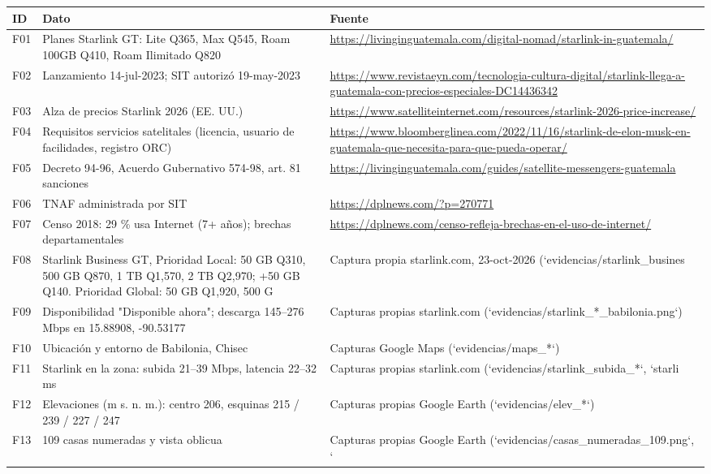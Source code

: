\begin{longtable}{p{.9cm}p{5.6cm}p{6.2cm}}\toprule ID & Dato & Fuente\\\midrule\endhead
F01 & Planes Starlink GT: Lite Q365, Max Q545, Roam 100GB Q410, Roam Ilimitado Q820 & \url{https://livinginguatemala.com/digital-nomad/starlink-in-guatemala/}\\
F02 & Lanzamiento 14-jul-2023; SIT autorizó 19-may-2023 & \url{https://www.revistaeyn.com/tecnologia-cultura-digital/starlink-llega-a-guatemala-con-precios-especiales-DC14436342}\\
F03 & Alza de precios Starlink 2026 (EE. UU.) & \url{https://www.satelliteinternet.com/resources/starlink-2026-price-increase/}\\
F04 & Requisitos servicios satelitales (licencia, usuario de facilidades, registro ORC) & \url{https://www.bloomberglinea.com/2022/11/16/starlink-de-elon-musk-en-guatemala-que-necesita-para-que-pueda-operar/}\\
F05 & Decreto 94-96, Acuerdo Gubernativo 574-98, art. 81 sanciones & \url{https://livinginguatemala.com/guides/satellite-messengers-guatemala}\\
F06 & TNAF administrada por SIT & \url{https://dplnews.com/?p=270771}\\
F07 & Censo 2018: 29 \% usa Internet (7+ años); brechas departamentales & \url{https://dplnews.com/censo-refleja-brechas-en-el-uso-de-internet/}\\
F08 & Starlink Business GT, Prioridad Local: 50 GB Q310, 500 GB Q870, 1 TB Q1,570, 2 TB Q2,970; +50 GB Q140. Prioridad Global: 50 GB Q1,920, 500 G & Captura propia starlink.com, 23-oct-2026 (`evidencias/starlink\_busines\\
F09 & Disponibilidad "Disponible ahora"; descarga 145–276 Mbps en 15.88908, -90.53177 & Capturas propias starlink.com (`evidencias/starlink\_*\_babilonia.png`)\\
F10 & Ubicación y entorno de Babilonia, Chisec & Capturas Google Maps (`evidencias/maps\_*`)\\
F11 & Starlink en la zona: subida 21–39 Mbps, latencia 22–32 ms & Capturas propias starlink.com (`evidencias/starlink\_subida\_*`, `starli\\
F12 & Elevaciones (m s. n. m.): centro 206, esquinas 215 / 239 / 227 / 247 & Capturas propias Google Earth (`evidencias/elev\_*`)\\
F13 & 109 casas numeradas y vista oblicua & Capturas propias Google Earth (`evidencias/casas\_numeradas\_109.png`, `\\

\end{longtable}
